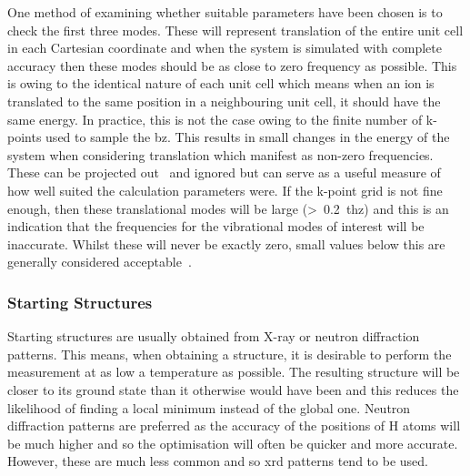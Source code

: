 One method of examining whether suitable parameters have been chosen is to check the first three modes. These will represent translation of the entire unit cell in each Cartesian coordinate and when the system is simulated with complete accuracy then these modes should be as close to zero frequency as possible. This is owing to the identical nature of each unit cell which means when an ion is translated to the same position in a neighbouring unit cell, it should have the same energy. In practice, this is not the case owing to the finite number of k\nobreakdash-points used to sample the \acrshort{bz}. This results in small changes in the energy of the system when considering translation which manifest as non\nobreakdash-zero frequencies. These can be projected out~\cite{Louck1976} and ignored but can serve as a useful measure of how well suited the calculation parameters were. If the k\nobreakdash-point grid is not fine enough, then these translational modes will be large (>~\SI{0.2}{\acrshort{thz}}) and this is an indication that the frequencies for the vibrational modes of interest will be inaccurate. Whilst these will never be exactly zero, small values below this are generally considered acceptable~\cite{Kendrick2020}.

\subsubsection{Starting Structures}
Starting structures are usually obtained from X-ray or neutron diffraction patterns. This means, when obtaining a structure, it is desirable to perform the measurement at as low a temperature as possible. The resulting structure will be closer to its ground state than it otherwise would have been and this reduces the likelihood of finding a local minimum instead of the global one. Neutron diffraction patterns are preferred as the accuracy of the positions of H atoms will be much higher and so the optimisation will often be quicker and more accurate. However, these are much less common and so \acrfull{xrd} patterns tend to be used. 

